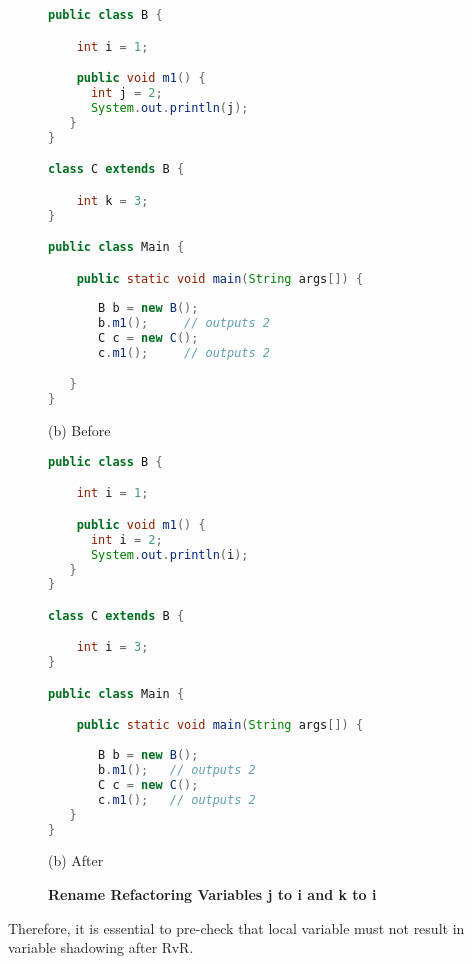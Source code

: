 \begin{figure}[th]
\centering
\begin{minipage}[t]{0.8\linewidth}
\begin{lstlisting}[language=java, basicstyle=\scriptsize\ttfamily,frame=single]
public class B {

    int i = 1;

    public void m1() {
      int j = 2;
      System.out.println(j);
   }
}

class C extends B {

    int k = 3;
}

public class Main {

    public static void main(String args[]) {
  
       B b = new B();
       b.m1();     // outputs 2
       C c = new C();
       c.m1();     // outputs 2

   }
}
\end{lstlisting}
\centering(b) Before 
\end{minipage}
\hfill
\begin{minipage}[t]{0.8\linewidth}
\begin{lstlisting}[language=java, basicstyle=\scriptsize\ttfamily,frame=single]
public class B {

    int i = 1;

    public void m1() {
      int i = 2;
      System.out.println(i);
   }
}

class C extends B {

    int i = 3;
}

public class Main {

    public static void main(String args[]) {
  
       B b = new B();
       b.m1();   // outputs 2
       C c = new C();
       c.m1();   // outputs 2
   }
}
\end{lstlisting}
\centering(b) After 
\end{minipage}
\caption{\textbf{Rename Refactoring Variables j to i  and k to i }}
\label{figure:precond5_4}
\end{figure}


Therefore, it is essential to pre-check that local variable must not result in variable shadowing after RvR.